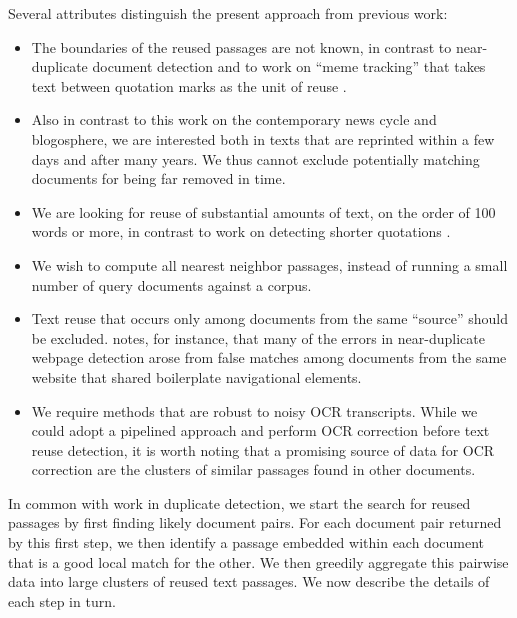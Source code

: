 \documentclass[pdftex,11pt]{article}
\begin{document}
Several attributes distinguish the present approach from previous
work:
\begin{itemize}

\item The boundaries of the reused passages are not known, in contrast
  to near-duplicate document detection and to work on ``meme
  tracking'' that takes text between quotation marks as the unit of
  reuse \citep{leskovec09:_meme_dynam_news_cycle,suen13:nifty}.

\item Also in contrast to this work on the contemporary news cycle and
  blogosphere, we are interested both in texts that are reprinted
  within a few days and after many years.  We thus cannot exclude
  potentially matching documents for being far removed in time.

\item We are looking for reuse of substantial amounts of text, on the
  order of 100 words or more, in contrast to work on detecting shorter
  quotations
  \citep{kolak08:_gener_links_minin_quotat,seo08:_local_text_reuse_detec,horton10:_somet_borrow,lease12:_findin_explor_memes_social_media}.

\item We wish to compute all nearest neighbor passages, instead of
  running a small number of query documents against a corpus.

\item Text reuse that occurs only among documents from the same
  ``source'' should be excluded.
  \citet{henzinger06:_findin_near_duplic_web_pages} notes, for
  instance, that many of the errors in near-duplicate webpage
  detection arose from false matches among documents from the same
  website that shared boilerplate navigational elements.

\item We require methods that are robust to noisy OCR transcripts.
  While we could adopt a pipelined approach and perform OCR correction
  before text reuse detection, it is worth noting that a promising
  source of data for OCR correction are the clusters of similar
  passages found in other documents.

\end{itemize}

In common with work in duplicate detection, we start the search for
reused passages by first finding likely document pairs.  For each
document pair returned by this first step, we then identify a passage
embedded within each document that is a good local match for the
other.  We then greedily aggregate this pairwise data into large
clusters of reused text passages.  We now describe the details of each
step in turn.
\end{document}
